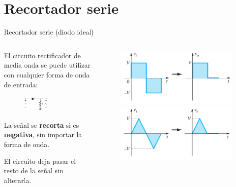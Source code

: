\documentclass[t,aspectratio=169]{beamer}
\begin{document}
\section{Recortador serie}
\begin{frame}{Recortador serie (diodo ideal)}

\begin{columns}
\begin{column}{0.5\textwidth}

El circuito rectificador de media onda se puede utilizar con cualquier forma de onda de entrada:

\begin{figure}
    \centering
    \includegraphics[width=0.5\textwidth]{figures/recortador_serie_ideal_circuito.png}
\end{figure}

La señal se \textbf{recorta} si es \textbf{negativa}, sin importar la forma de onda. 

\vspace{5mm}El circuito deja pasar el resto de la señal sin alterarla.

\end{column}
\begin{column}{0.5\textwidth}

\begin{figure}
    \centering
    \includegraphics[width=\textwidth]{figures/recortador_serie_ideal_1.png}
    \includegraphics[width=\textwidth]{figures/recortador_serie_ideal_2.png}
\end{figure}


\end{column}
\end{columns}
\end{frame}
\end{document}
